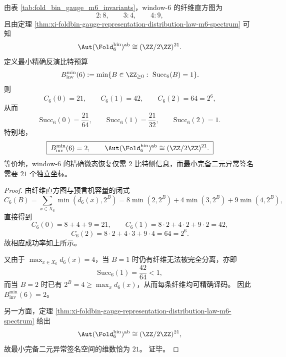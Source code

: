 \begin{proposition}\label{prop:xi-window6-two-bit-recovery-vs-21bit-signature}
由表 \ref{tab:fold_bin_gauge_m6_invariants}，window-\(6\) 的纤维直方图为
\[
2:8,\qquad 3:4,\qquad 4:9,
\]
且由定理 \ref{thm:xi-foldbin-gauge-representation-distribution-law-m6-spectrum} 可知
\[
\Aut(\Fold_6^{\mathrm{bin}})^{\mathrm{ab}}\cong (\ZZ/2\ZZ)^{21}.
\]
定义最小精确反演比特预算
\[
B_{\mathrm{inv}}^{\min}(6):=\min\{B\in\ZZ_{\ge 0}:\ \mathrm{Succ}_6(B)=1\}.
\]
则
\[
C_6(0)=21,\qquad
C_6(1)=42,\qquad
C_6(2)=64=2^6,
\]
从而
\[
\mathrm{Succ}_6(0)=\frac{21}{64},\qquad
\mathrm{Succ}_6(1)=\frac{21}{32},\qquad
\mathrm{Succ}_6(2)=1.
\]
特别地，
\[
\boxed{\;
B_{\mathrm{inv}}^{\min}(6)=2,\qquad
\Aut(\Fold_6^{\mathrm{bin}})^{\mathrm{ab}}\cong (\ZZ/2\ZZ)^{21}.\;}
\]
等价地，window-\(6\) 的精确微态恢复仅需 \(2\) 比特侧信息，而最小完备二元异常签名需要 \(21\) 个独立坐标。
\end{proposition}
\begin{proof}
由纤维直方图与预言机容量的闭式
\[
C_6(B)=\sum_{x\in X_6}\min(d_6(x),2^B)
=8\min(2,2^B)+4\min(3,2^B)+9\min(4,2^B),
\]
直接得到
\[
C_6(0)=8+4+9=21,
\qquad
C_6(1)=8\cdot 2+4\cdot 2+9\cdot 2=42,
\]
\[
C_6(2)=8\cdot 2+4\cdot 3+9\cdot 4=64=2^6.
\]
故相应成功率如上所示。

又由于 \(\max_{x\in X_6}d_6(x)=4\)，当 \(B=1\) 时仍有纤维无法被完全分离，亦即
\[
\mathrm{Succ}_6(1)=\frac{42}{64}<1,
\]
而当 \(B=2\) 时已有 \(2^B=4\ge \max_x d_6(x)\)，从而每条纤维均可精确译码。
因此 \(B_{\mathrm{inv}}^{\min}(6)=2\)。

另一方面，定理 \ref{thm:xi-foldbin-gauge-representation-distribution-law-m6-spectrum} 给出
\[
\Aut(\Fold_6^{\mathrm{bin}})^{\mathrm{ab}}\cong (\ZZ/2\ZZ)^{21},
\]
故最小完备二元异常签名空间的维数恰为 \(21\)。
证毕。
\end{proof}

\endinput
